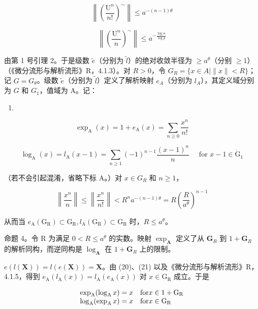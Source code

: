 \[
\left\| \left(\frac {\mathrm{U} ^ {n}}{n !}\right) ^ {\sim} \right\| \leqslant a ^ {- (n - 1) \theta}\tag{20}
\]

\[
\left\| \left(\frac {\mathrm{U} ^ {n}}{n}\right) ^ {\sim} \right\| \leqslant a ^ {- \frac {\log n}{\log p}}\tag{21}
\]

由第 1 号引理 2。于是级数 \(\tilde{e}\)（分别为 \(\tilde{l}\)）的绝对收敛半径为 \(\geqslant a^\theta\)（分别 \(\geqslant 1\)）（《微分流形与解析流形》R，4.1.3）。对 \(R > 0\)，令 \(G_R = \{x \in A \mid \|x\|<R\}\)；记 \(G = G_\theta\)。级数 \(\tilde{e}\)（分别为 \(\tilde{l}\)）定义了解析映射 \(e_{A}\)（分别为 \(l_{A}\)），其定义域分别为 \(G\) 和 \(G_{1}\)，值域为 A。记：

\begin{enumerate}
\def\labelenumi{(\arabic{enumi})}
\setcounter{enumi}{21}
\tightlist
\item
\end{enumerate}

\[
\exp_ {\mathrm{A}} (x) = 1 + e _ {\mathrm{A}} (x) = \sum_ {n \geqslant 0} \frac {x ^ {n}}{n !}\tag{22}
\]

\[
\log_ {\mathrm{A}} (x) = l _ {\mathrm{A}} (x - 1) = \sum_ {n \geqslant 1} (- 1) ^ {n - 1} \frac {(x - 1) ^ {n}}{n} \quad \text { for } x - 1 \in \dot {\mathrm{G}} _ {1}\tag{23}
\]

（若不会引起混淆，省略下标 A。）对 \(x \in G_R\) 和 \(n \geqslant 1\)，

\[
\left\| \frac {x ^ {n}}{n} \right\| \leqslant \left\| \frac {x ^ {n}}{n !} \right\| <   R ^ {n} a ^ {- (n - 1) \theta} = R \left(\frac {R}{a ^ {\theta}}\right) ^ {n - 1}\tag{24}
\]

从而当 \(e_{\mathrm{A}}(\mathrm{G}_{\mathrm{R}}) \subset \mathrm{G}_{\mathrm{R}}, l_{\mathrm{A}}(\mathrm{G}_{\mathrm{R}}) \subset \mathrm{G}_{\mathrm{R}}\) 时，\(R \leqslant a^{\theta}\)。

命题 4。令 R 为满足 \(0 < R \leqslant a^{\theta}\) 的实数。映射 \(\exp_{\mathbf{A}}\) 定义了从 \(\mathbf{G}_{R}\) 到 \(1 + \mathbf{G}_{R}\) 的解析同构，而逆同构是 \(\log_{\mathbf{A}}\) 在 \(1 + \mathbf{G}_{R}\) 上的限制。

\(e(l(\mathbf{X})) = l(e(\mathbf{X})) = \mathbf{X}\)。由 (20)、(21) 以及《微分流形与解析流形》R，4.1.5，得到 \(e_{\mathrm{A}}(l_{\mathrm{A}}(x)) = l_{\mathrm{A}}(e_{\mathrm{A}}(x))\) 对 \(x \in \mathrm{G}_{\mathrm{R}}\) 成立。于是

\[
\begin{array}{l l} \exp_ {\mathrm{A}} (\log_ {\mathrm{A}} x) = x & \text {for} x \in 1 + \mathrm{G} _ {\mathrm{R}} \\ \log_ {\mathrm{A}} (\exp_ {\mathrm{A}} x) = x & \text {for} x \in \mathrm{G} _ {\mathrm{R}} \end{array}
\]

